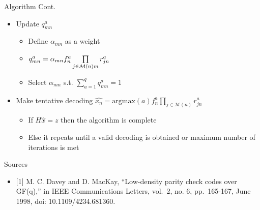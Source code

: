 \documentclass[10pt,ignorenonframetext,]{beamer}
\providecommand{\tightlist}{%
  \setlength{\itemsep}{0pt}\setlength{\parskip}{0pt}}
\begin{document}
\begin{frame}{Algorithm Cont.}
\protect\hypertarget{algorithm-cont.}{}
\begin{itemize}[<+->]
\tightlist
\item
  Update \(q^a_{mn}\)

  \begin{itemize}[<+->]
  \tightlist
  \item
    Define \(\alpha_{mn}\) as a weight
  \item
    \(q^a_{mn} = \alpha_{mn} f^a_n\prod\limits_{j\in\mathcal{M}(n)\\m}r^a_{jn}\)
  \item
    Select \(\alpha_{mn}\) s.t. \(\sum_{a=1}^q q^a_{mn} = 1\)
  \end{itemize}
\item
  Make tentative decoding
  \(\hat{x_n} = \text{argmax}(a)f^a_n\prod\limits_{j\in\mathcal{M}(n)}r^a_{jn}\)

  \begin{itemize}[<+->]
  \tightlist
  \item
    If \(H\hat{x} = z\) then the algorithm is complete
  \item
    Else it repeats until a valid decoding is obtained or maximum number
    of iterations is met
  \end{itemize}
\end{itemize}
\end{frame}

\begin{frame}{Sources}
\protect\hypertarget{sources}{}
\begin{itemize}[<+->]
\tightlist
\item
  {[}1{]} M. C. Davey and D. MacKay, ``Low-density parity check codes
  over GF(q),'' in IEEE Communications Letters, vol.~2, no. 6,
  pp.~165-167, June 1998, doi: 10.1109/4234.681360.
\end{itemize}
\end{frame}
\end{document}
